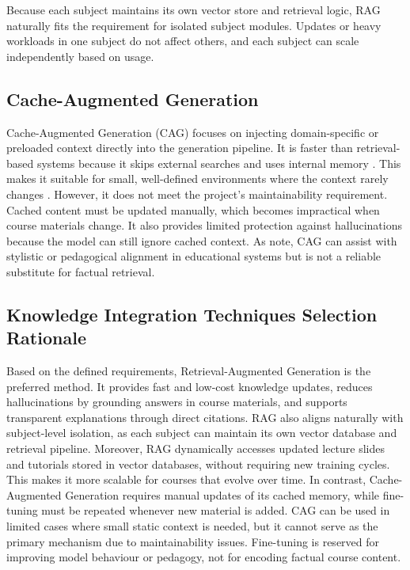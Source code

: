 Because each subject maintains its own vector store and retrieval logic, RAG naturally fits the requirement for isolated subject modules. Updates or heavy workloads in one subject do not affect others, and each subject can scale independently based on usage.

\subsection{Cache-Augmented Generation}
Cache-Augmented Generation (CAG) focuses on injecting domain-specific or preloaded context directly into the generation pipeline. It is faster than retrieval-based systems because it skips external searches and uses internal memory \parencite{RAGvsCAG99:online}. This makes it suitable for small, well-defined environments where the context rarely changes \parencite{RAGvsCAG95:online}. However, it does not meet the project's maintainability requirement. Cached content must be updated manually, which becomes impractical when course materials change. It also provides limited protection against hallucinations because the model can still ignore cached context. As \parencite{2506059250:online} note, CAG can assist with stylistic or pedagogical alignment in educational systems but is not a reliable substitute for factual retrieval.

\subsection{Knowledge Integration Techniques Selection Rationale}
Based on the defined requirements, Retrieval-Augmented Generation is the preferred method. It provides fast and low-cost knowledge updates, reduces hallucinations by grounding answers in course materials, and supports transparent explanations through direct citations. RAG also aligns naturally with subject-level isolation, as each subject can maintain its own vector database and retrieval pipeline. Moreover, RAG dynamically accesses updated lecture slides and tutorials stored in vector databases, without requiring new training cycles. This makes it more scalable for courses that evolve over time. In contrast, Cache-Augmented Generation requires manual updates of its cached memory, while fine-tuning must be repeated whenever new material is added. CAG can be used in limited cases where small static context is needed, but it cannot serve as the primary mechanism due to maintainability issues. Fine-tuning is reserved for improving model behaviour or pedagogy, not for encoding factual course content.

